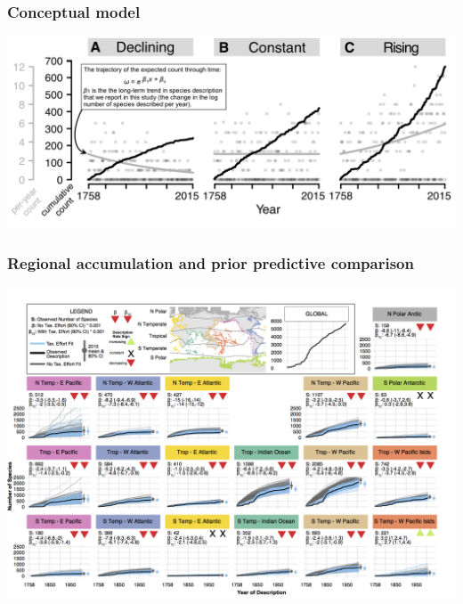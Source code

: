 \documentclass{beamer}
\begin{document}
\begin{frame}
  \frametitle{Conceptual model}
  \begin{center}
    \includegraphics[width=\textwidth,height=0.8\textheight,keepaspectratio=true]{figure/edie_concept}
  \end{center}

\end{frame}

\begin{frame}
  \frametitle{Regional accumulation and prior predictive comparison}

  \begin{center}
    \includegraphics[width=\textwidth,height=0.8\textheight,keepaspectratio=true]{figure/edie_cumm_regional}
  \end{center}

\end{frame}
\end{document}
